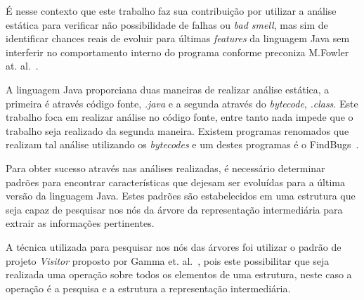 \'{E} nesse contexto que este trabalho faz sua contribui\c{c}\~{a}o por utilizar a an\'{a}lise est\'{a}tica para verificar n\~{a}o possibilidade de falhas ou \textit{bad smell}, mas sim de identificar chances reais de evoluir para \'{u}ltimas \textit{features} da linguagem Java sem interferir no comportamento interno do programa conforme preconiza M.Fowler at. al.~\cite{martinFowlerRafactoring}.

A linguagem Java proporciana duas maneiras de realizar an\'{a}lise est\'{a}tica, a primeira \'{e} através c\'{o}digo fonte, \textit{.java} e a segunda atrav\'{e}s do \textit{bytecode}, \textit{.class}. Este trabalho foca em realizar an\'{a}lise no c\'{o}digo fonte, entre tanto nada impede que o trabalho seja realizado da segunda maneira. Existem programas renomados que realizam tal an\'{a}lise utilizando os \textit{bytecodes} e um destes programas \'{e} o FindBugs~\cite{FindBugs}.


Para obter sucesso atrav\'{e}s nas an\'{a}lises realizadas, \'{e} necess\'{a}rio determinar padr\~{o}es para encontrar caracter\'{i}sticas que dejesam ser evolu\'{i}das para a \'{u}ltima vers\~{a}o da linguagem Java. Estes padr\~{o}es s\~{a}o estabelecidos em uma estrutura que seja capaz de pesquisar nos n\'{o}s da \'{a}rvore da representa\c{c}\~{a}o intermedi\'{a}ria para extrair as informa\c{c}\~{o}es pertinentes.


A t\'{e}cnica utilizada para pesquisar nos n\'{o}s das \'{a}rvores foi utilizar o padr\~{a}o de projeto \textit{Visitor} proposto por  Gamma et. al.~\cite{Gamma:1995}, pois este possibilitar que seja realizada uma opera\c{c}\~{a}o sobre todos os elementos de uma estrutura,  neste caso a opera\c{c}\~{a}o  \'{e} a pesquisa e a estrutura a representa\c{c}\~{a}o intermedi\'{a}ria.


